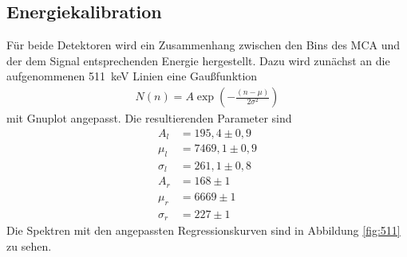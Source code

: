 \subsection{Energiekalibration}
Für beide Detektoren wird ein Zusammenhang zwischen den Bins des MCA und der dem Signal entsprechenden Energie hergestellt. Dazu wird zunächst an die aufgenommenen \SI{511}{\kilo\electronvolt} Linien eine Gaußfunktion
\begin{align}
  N(n)=A \exp \left( -\frac{(n-\mu)}{2 \sigma^2} \right)
  \label{eq:gauss}
\end{align}
mit Gnuplot angepasst. Die resultierenden Parameter sind
\begin{align*}
  A_l&=195,4 \pm 0,9\\
  \mu_l&=7469,1 \pm 0,9\\
  \sigma_l&=261,1 \pm 0,8\\
  A_r&=168 \pm 1\\
  \mu_r&=6669 \pm 1\\
  \sigma_r&=227 \pm 1
\end{align*}
Die Spektren mit den angepassten Regressionskurven sind in Abbildung \ref{fig:511} zu sehen.
